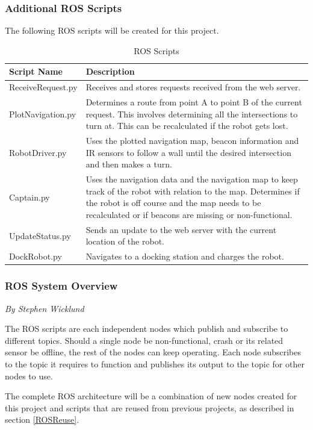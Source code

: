 \documentclass[12pt]{report}
\newcommand{\sectionAuthor}[1]{{\small\vspace{-1em}\textit{#1}}\bigskip\par}
\begin{document}
\subsubsection{Additional ROS Scripts}
The following ROS scripts will be created for this project.
\begin{table}[H]
\centering
\caption{ROS Scripts}
\centering
\begin{tabular} { | p{4cm} | p{8cm} | }
\hline
Script Name & Description \\
\hline
ReceiveRequest.py & Receives and stores requests received from the web server.\\
\hline
PlotNavigation.py & Determines a route from point A to point B of the current request. This involves determining all the intersections to turn at. This can be recalculated if the robot gets lost.\\
\hline
RobotDriver.py & Uses the plotted navigation map, beacon information and IR sensors to follow a wall until the desired intersection and then makes a turn. \\
\hline
Captain.py & Uses the navigation data and the navigation map to keep track of the robot with relation to the map. Determines if the robot is off course and the map needs to be recalculated or if beacons are missing or non-functional. \\
\hline
UpdateStatus.py & Sends an update to the web server with the current location of the robot.\\
\hline
DockRobot.py & Navigates to a docking station and charges the robot.\\
\hline
\end{tabular}
\end{table}%

\subsubsection{ROS System Overview}
\sectionAuthor{By Stephen Wicklund}
The ROS scripts are each independent nodes which publish and subscribe to different topics. Should a single node be non-functional, crash or its related sensor be offline, the rest of the nodes can keep operating. Each node subscribes to the topic it requires to function and publishes its output to the topic for other nodes to use.

The complete ROS architecture will be a combination of new nodes created for this project and scripts that are reused from previous projects, as described in section \ref{ROSReuse}.
\end{document}
